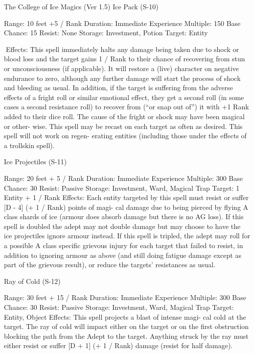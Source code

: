 \begin{Chapter}{The College of Ice Magics (Ver 1.5)}
Ice Pack (S-10) 

Range: 10 feet +5 / Rank 
Duration: Immediate 
Experience Multiple: 150 
Base Chance: 15%
Resist: None 
Storage: Investment, Potion 
Target: Entity 

Effects:  This  spell  immediately  halts  any  damage 
being  taken  due  to  shock  or  blood  loss  and  the 
target gains 1 / Rank to their chance of recovering 
from stun or unconsciousness (if applicable). It will 
restore  a  (live)  character  on  negative  endurance  to 
zero,  although  any  further  damage  will  start  the 
process of shock and bleeding as usual. In addition, 
if the target is suffering from the adverse effects of 
a  fright  roll  or  similar  emotional  effect, they  get  a 
second roll (in some cases a second resistance roll) 
to  recover  from  (“or  snap  out  of”)  it  with  +1%
Rank  added  to  their  dice  roll.  The  cause  of  the 
fright  or  shock  may  have  been  magical  or  other-
wise.  This  spell  may  be  recast  on  each  target  as 
often as desired. This spell will not work on regen-
erating entities (including those under the effects of 
a trollskin spell). 

Ice Projectiles (S-11) 

Range: 20 feet + 5 / Rank 
Duration: Immediate 
Experience Multiple: 300 
Base Chance: 30%
Resist: Passive 
Storage: Investment, Ward, Magical Trap 
Target: 1 Entity + 1 / Rank 
Effects:  Each  entity  targeted  by  this  spell  must 
resist or suffer [D - 4] (+ 1 / Rank) points of magi-
cal damage due to being pierced by flying A class 
shards of ice (armour does absorb damage but there 
is  no  AG  loss).  If  this  spell  is  doubled  the  adept 
may  not  double  damage  but  may  choose  to  have 
the  ice  projectiles  ignore  armour  instead.  If  this 
spell is tripled, the adept may roll for a possible A 
class  specific  grievous  injury  for  each  target  that 
failed  to  resist,  in  addition  to  ignoring  armour  as 
above  (and  still  doing  fatigue  damage  except  as 
part  of  the  grievous  result),  or  reduce  the  targets’ 
resistances as usual. 

Ray of Cold (S-12) 

Range: 30 feet + 15 / Rank 
Duration: Immediate 
Experience Multiple: 300 
Base Chance: 30%
Resist: Passive 
Storage: Investment, Ward, Magical Trap 
Target: Entity, Object 
Effects: This spell projects a blast of intense magi-
cal  cold  at  the  target.  The  ray  of  cold  will  impact 
either  on  the  target  or  on  the  first  obstruction 
blocking  the  path  from  the  Adept  to  the  target. 
Anything  struck  by  the  ray  must  either  resist  or 
suffer [D + 1] (+ 1 / Rank) damage (resist for half 
damage). 


\end{Chapter}
